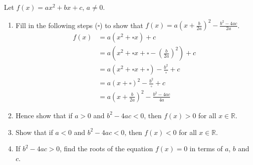 \begin{question}
    Let $f(x) = ax^2 + bx + c$, $a \ne 0$. 
    \begin{enumerate}
        \item Fill in the following steps ($\square$) to show that $f(x) = a(x
            + \frac{b}{2a})^2 - \frac{b^2 - 4ac}{2a}$. 
            \begin{align*}
                f(x) &= a(x^2 + \square x) + c\\
                &= a\left(x^2 + \square x + \square - \left(\frac{b}{2a}\right)^2\right) + c\\
                &= a(x^2 + \square x + \square)- \frac{b^2}{\square} + c\\
                &= a(x + \square)^2 - \frac{b^2}{\square} + c\\
                &= a\left(x + \frac{b}{2a}\right)^2 - \frac{b^2 - 4ac}{4a}
            \end{align*}
        
        \item Hence show that if $a > 0$ and $b^2 - 4ac < 0$, then $f(x) > 0$
            for all $x \in \mathbb{R}$. 
        
        \item Show that if $a < 0$ and $b^2 - 4ac < 0$, then $f(x) < 0$ for all
            $x \in \mathbb{R}$.
        
        \item If $b^2 - 4ac > 0$, find the roots of the equation $f(x) = 0$ in
            terms of $a$, $b$ and $c$. 
    \end{enumerate}
\end{question}
